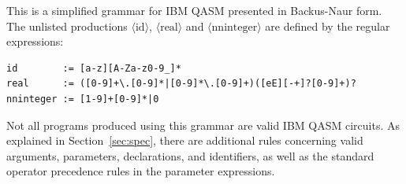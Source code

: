 \documentclass[USenglish,12pt,fleqn]{article} %
\begin{document}
This is a simplified grammar for IBM QASM presented in Backus-Naur form. The unlisted productions $\langle\mathrm{id}\rangle$, $\langle\mathrm{real}\rangle$ and $\langle\mathrm{nninteger}\rangle$ are defined by the regular expressions:
\begin{verbatim}
id        := [a-z][A-Za-z0-9_]*
real      := ([0-9]+\.[0-9]*|[0-9]*\.[0-9]+)([eE][-+]?[0-9]+)?
nninteger := [1-9]+[0-9]*|0
\end{verbatim}
Not all programs produced using this grammar are valid IBM QASM circuits. As explained in Section~\ref{sec:spec}, there are additional rules concerning valid arguments, parameters, declarations, and identifiers, as well as the standard operator precedence rules in the parameter expressions.
             


\end{document}
